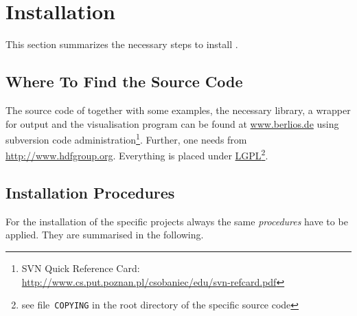 \section{Installation}
This section summarizes the necessary steps to install \MBSim{}.

\subsection{Where To Find the Source Code}
The source code of \MBSim{} together with some examples, the necessary \FMatVec{} library, a \HDF{} wrapper for output and the visualisation program \OpenMBV{} can be found at \url{www.berlios.de} using subversion code administration\footnote{SVN Quick Reference Card: \url{http://www.cs.put.poznan.pl/csobaniec/edu/svn-refcard.pdf}}. Further, one needs \HDF{} from \url{http://www.hdfgroup.org}. Everything is placed under \href{http://www.gnu.org/licenses/lgpl.html}{LGPL}\footnote{see file~\texttt{COPYING} in the root directory of the specific source code}.\par

\subsection{Installation Procedures}
For the installation of the specific projects always the same \emph{procedures} have to be applied. They are summarised in the following.

